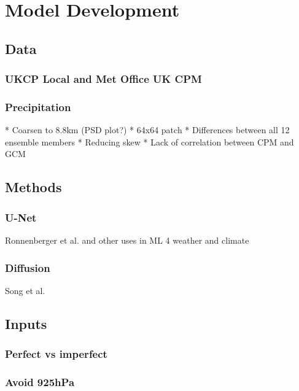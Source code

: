 \chapter{Model Development}
\label{chap:model-dev}

\section{Data}

\subsection{UKCP Local and Met Office UK CPM}

\subsection{Precipitation}

* Coarsen to 8.8km (PSD plot?)
* 64x64 patch
* Differences between all 12 ensemble members
* Reducing skew
* Lack of correlation between CPM and GCM

\section{Methods}

\subsection{U-Net}

Ronnenberger et al. and other uses in ML 4 weather and climate

\subsection{Diffusion}

Song et al.

\section{Inputs}

\subsection{Perfect vs imperfect}

\subsection{Avoid 925hPa}


